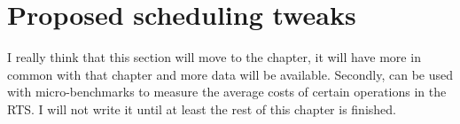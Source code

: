
\section{Proposed scheduling tweaks}
\label{sec:proposed_tweaks}

I really think that this section will move to the \tscope chapter,
it will have more in common with that chapter and more data will be
available.
Secondly, \tscope can be used with micro-benchmarks to measure the
average costs of certain operations in the RTS.
I will not write it until at least the rest of this chapter is finished.

%
%

%

%
%

